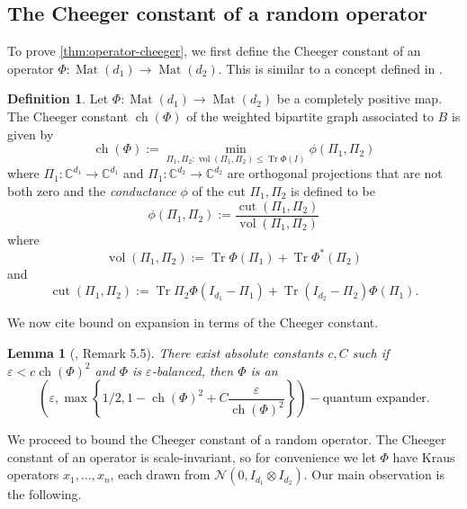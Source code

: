 \documentclass[aos]{imsart}
\newtheorem{lemma}[theorem]{Lemma}
\theoremstyle{definition}
\newtheorem*{definition}{Definition}
\numberwithin{equation}{section}
\DeclareMathOperator{\vol}{vol}
\DeclareMathOperator{\cut}{cut}
\DeclareMathOperator{\ch}{ch}
\DeclareMathOperator{\Mat}{Mat}
\DeclareMathOperator{\tr}{Tr}
\newcommand{\C}{{\mathbb{C}}}
\newcommand{\ot}{\otimes}
\newcommand{\eps}{\varepsilon}
\newcommand{\cN}{\mathcal{N}}
\newcommand{\samp}{x}
\begin{document}
\begin{appendix}
\section{The Cheeger constant of a random operator}\label{app:cheeky}

To prove \cref{thm:operator-cheeger}, we first define the Cheeger constant of an operator $\Phi:\Mat(d_1) \to \Mat(d_2)$. This is similar to a concept defined in \cite{H07}.
\begin{definition}
Let $\Phi : \Mat(d_1) \to \Mat(d_2)$ be a completely positive map. The Cheeger constant $\ch(\Phi)$ of the weighted bipartite graph associated to $B$ is given by
$$\ch(\Phi):=\min_{\Pi_1, \Pi_2: \vol(\Pi_1, \Pi_2) \leq \tr \Phi(I)} \phi(\Pi_1,\Pi_2)$$
where $\Pi_1: \C^{d_1} \to \C^{d_1}$ and $\Pi_1: \C^{d_2} \to \C^{d_2}$ are orthogonal projections that are not both zero and the \emph{conductance} $\phi$ of the cut $\Pi_1, \Pi_2$ is defined to be
$$\phi(\Pi_1,\Pi_2) := \frac{\cut(\Pi_1, \Pi_2)}{\vol(\Pi_1,\Pi_2)}$$
where
$$ \vol(\Pi_1,\Pi_2):=
\tr \Phi(\Pi_1) + \tr \Phi^*(\Pi_2)$$
and $$ \cut(\Pi_1, \Pi_2):= \tr \Pi_2 \Phi(I_{d_1} - \Pi_1) + \tr (I_{d_2} - \Pi_2) \Phi(\Pi_1).$$
\end{definition}

We now cite bound on expansion in terms of the Cheeger constant.

\begin{lemma} [\cite{FM20}, Remark 5.5]\label{lem:op-cheeger} There exist absolute constants $c, C$ such if $\eps < c \ch(\Phi)^2$ and $\Phi$ is $\eps$-balanced, then $\Phi$ is an
$$ \left(\eps, \max\left\{1/2, 1 -  \ch(\Phi)^2 + C \frac{\eps}{\ch(\Phi)^2} \right\} \right)-\text{quantum expander}.$$
\end{lemma}
We proceed to bound the Cheeger constant of a random operator. The Cheeger constant of an operator is scale-invariant, so for convenience we let $\Phi$ have Kraus operators $\samp_1, \dots, \samp_n$, each drawn from $\cN(0,  I_{d_1} \ot I_{d_2}).$ Our main observation is the following.


\end{appendix}
\end{document}
